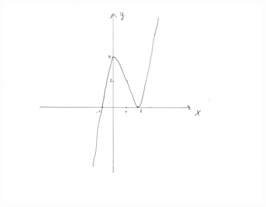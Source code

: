 \documentclass[a4paper,12pt]{article}
\begin{document}
\begin{enumerate}
\begin{center}
\includegraphics[scale=0.4]{grah1.png}
\end{center}
\end{enumerate}

\newpage
\end{document}
